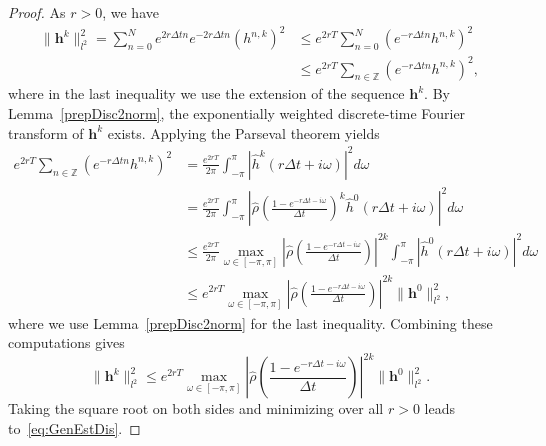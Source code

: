 \documentclass[10pt,a4paper]{amsart}
\begin{document}
\begin{proof}
As $r>0$, we have
\begin{align*}
	\|\boldsymbol{h}^k\|_{l^2}^2  = \sum_{n=0}^{N} e^{2 r \Delta t n}e^{-2 r \Delta t n} \left(h^{n,k}\right)^2 
	&\leq e^{2 rT} \sum_{n=0}^{N}  \left(e^{-r \Delta t n}h^{n,k}\right)^2 \\
	&\leq e^{2 rT} \sum_{n\in\mathbb{Z}} \left( e^{- r \Delta t n}h^{n,k}\right)^2,
\end{align*}
where in the last inequality we use the extension of the sequence $\boldsymbol{h}^k$. By Lemma~\ref{prepDisc2norm}, the exponentially weighted discrete-time Fourier transform of $\boldsymbol{h}^k$ exists. Applying the Parseval theorem yields 
\[\begin{aligned}
e^{2rT} \sum_{n\in\mathbb{Z}} \left( e^{- r \Delta t n}h^{n,k}\right)^2 
&= \frac{e^{2rT}}{2 \pi} \int_{-\pi}^{\pi} \left| \widehat{h}^{k}(r \Delta t + i \omega) \right|^2 d \omega \\
&= \frac{e^{2rT}}{2 \pi} \int_{-\pi}^{\pi} \left| \hat{\rho}\left(\frac{1-e^{-r \Delta t -i \omega}}{\Delta t}\right)^k \widehat{h}^{0}(r \Delta t + i \omega) \right|^2 d \omega \\
&\leq \frac{e^{2rT}}{2 \pi} \max_{\omega \in [-\pi,\pi]} \left|\hat{\rho}\left(\frac{1-e^{-r \Delta t -i \omega}}{\Delta t}\right)\right|^{2k}\int_{-\pi}^{\pi} \left| \widehat{h}^{0}(r \Delta t + i \omega) \right|^2  d \omega\\
&\leq e^{2rT} \max_{\omega \in [-\pi,\pi]} \left|\hat{\rho}\left(\frac{1-e^{-r \Delta t -i \omega}}{\Delta t}\right)\right|^{2k} \|\boldsymbol{h}^0\|_{l^2}^2,
\end{aligned}\]
where we use Lemma~\ref{prepDisc2norm} for the last inequality. Combining these computations gives
\[\|\boldsymbol{h}^k\|_{l^2}^2 \leq e^{2rT} \max_{\omega \in [-\pi,\pi]} \left|\hat{\rho}\left(\frac{1-e^{-r \Delta t -i \omega}}{\Delta t}\right)\right|^{2k} \|\boldsymbol{h}^0\|_{l^2}^2.\]
Taking the square root on both sides and minimizing over all $r > 0$ leads to~\eqref{eq:GenEstDis}.
\end{proof}
\end{document}
